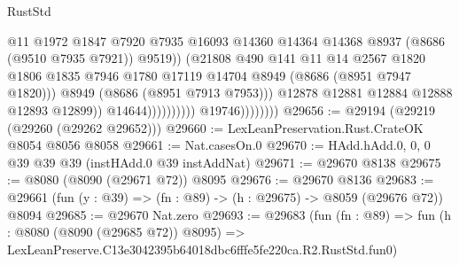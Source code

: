 \begin{lexlean}{RustStd}
\begin{coremodule}
                                                  @11
                                                  @1972
                                                  @1847
                                                  @7920
                                                  @7935
                                                  @16093
                                                  @14360
                                                  @14364
                                                  @14368
                                                  @8937
                                                  (@8686 (@9510 @7935 @7921))
                                                  @9519))
                                              (@21808
                                                @490
                                                @141
                                                @11
                                                @14
                                                @2567
                                                @1820
                                                @1806
                                                @1835
                                                @7946
                                                @1780
                                                @17119
                                                @14704
                                                @8949
                                                (@8686 (@8951 @7947 @1820)))
                                              @8949
                                              (@8686 (@8951 @7913 @7953)))
                                            @12878
                                            @12881
                                            @12884
                                            @12888
                                            @12893
                                            @12899))
                                        @14644))))))))))
                    @19746))))))))
@29656 := @29194 (@29219 (@29260 (@29262 @29652)))
@29660 := LexLeanPreservation.Rust.CrateOK @8054 @8056 @8058
@29661 := Nat.casesOn.{0}
@29670 := HAdd.hAdd.{0, 0, 0} @39 @39 @39 (instHAdd.{0} @39 instAddNat)
@29671 := @29670 @8138
@29675 := @8080 (@8090 (@29671 @72)) @8095
@29676 := @29670 @8136
@29683 := @29661 (fun (y : @39) => (fn : @89) -> (h : @29675) -> @8059 (@29676 @72)) @8094
@29685 := @29670 Nat.zero
@29693 := @29683
    (fun (fn : @89) =>
    fun (h : @8080 (@8090 (@29685 @72)) @8095) =>
    LexLeanPreserve.C13e3042395b64018dbc6fffe5fe220ca.R2.RustStd.fun0)

\end{coremodule}
\end{lexlean}
